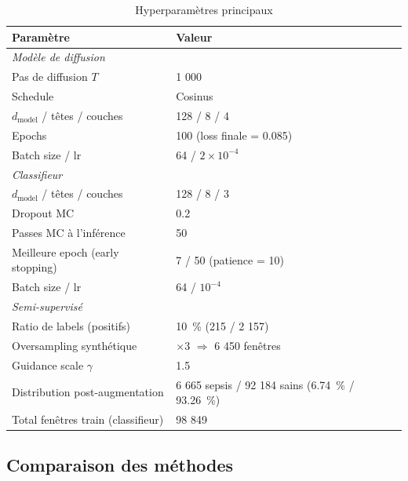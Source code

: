 \documentclass[11pt,a4paper]{article}
\begin{document}
\begin{table}[H]
\centering
\caption{Hyperparamètres principaux}
\begin{tabular}{ll}
\toprule
\textbf{Paramètre} & \textbf{Valeur} \\
\midrule
\multicolumn{2}{l}{\textit{Modèle de diffusion}} \\
Pas de diffusion $T$ & 1 000 \\
Schedule & Cosinus \\
$d_\text{model}$ / têtes / couches & 128 / 8 / 4 \\
Epochs & 100 (loss finale = 0.085) \\
Batch size / lr & 64 / $2\times10^{-4}$ \\
\midrule
\multicolumn{2}{l}{\textit{Classifieur}} \\
$d_\text{model}$ / têtes / couches & 128 / 8 / 3 \\
Dropout MC & 0.2 \\
Passes MC à l'inférence & 50 \\
Meilleure epoch (early stopping) & 7 / 50 (patience = 10) \\
Batch size / lr & 64 / $10^{-4}$ \\
\midrule
\multicolumn{2}{l}{\textit{Semi-supervisé}} \\
Ratio de labels (positifs) & 10~\% (215 / 2 157) \\
Oversampling synthétique & $\times 3$ $\Rightarrow$ 6 450 fenêtres \\
Guidance scale $\gamma$ & 1.5 \\
Distribution post-augmentation & 6 665 sepsis / 92 184 sains (6.74~\% / 93.26~\%) \\
Total fenêtres train (classifieur) & 98 849 \\
\bottomrule
\end{tabular}
\end{table}

\subsection{Comparaison des méthodes}
\end{document}
